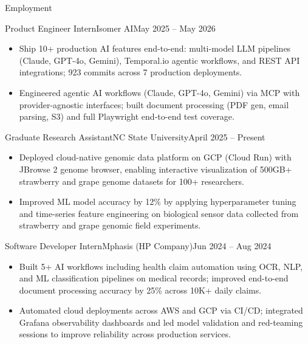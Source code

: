 \documentclass[]{mcdowellcv}
\begin{document}
\makeheader

\begin{cvsection}{Employment}
  \begin{cvsubsection}{Product Engineer Intern}{Isomer AI}{May 2025 -- May 2026}
    \begin{itemize}
      \item Ship 10+ production AI features end-to-end: multi-model LLM pipelines (Claude, GPT-4o, Gemini), Temporal.io agentic workflows, and REST API integrations; 923 commits across 7 production deployments.
      \item Engineered agentic AI workflows (Claude, GPT-4o, Gemini) via MCP with provider-agnostic interfaces; built document processing (PDF gen, email parsing, S3) and full Playwright end-to-end test coverage.
    \end{itemize}
    \vspace{-1.5pt}
  \end{cvsubsection}

  \begin{cvsubsection}{Graduate Research Assistant}{NC State University}{April 2025 -- Present}
    \begin{itemize}
      \item Deployed cloud-native genomic data platform on GCP (Cloud Run) with JBrowse 2 genome browser, enabling interactive visualization of 500GB+ strawberry and grape genome datasets for 100+ researchers.
      \item Improved ML model accuracy by 12\% by applying hyperparameter tuning and time-series feature engineering on biological sensor data collected from strawberry and grape genomic field experiments.
    \end{itemize}
    \vspace{-1.5pt}
  \end{cvsubsection}

  \begin{cvsubsection}{Software Developer Intern}{Mphasis (HP Company)}{Jun 2024 -- Aug 2024}
    \begin{itemize}
      \item Built 5+ AI workflows including health claim automation using OCR, NLP, and ML classification pipelines on medical records; improved end-to-end document processing accuracy by 25\% across 10K+ daily claims.
      \item Automated cloud deployments across AWS and GCP via CI/CD; integrated Grafana observability dashboards and led model validation and red-teaming sessions to improve reliability across production services.
    \end{itemize}
    \vspace{-1.5pt}
  \end{cvsubsection}


\end{cvsection}
\end{document}
